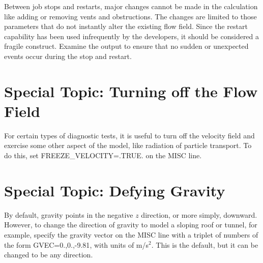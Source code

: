 \documentclass[11pt]{book}
\begin{document}
Between job stops and restarts, major changes cannot be made in the calculation like adding or removing vents and obstructions. The changes are limited to those parameters that do not instantly alter the existing flow field. Since the restart capability has been used infrequently by the developers, it should be considered a fragile construct. Examine the output to ensure that no sudden or unexpected events occur during the stop and restart.





\section{Special Topic: Turning off the Flow Field}
\label{info:freeze_velocity}

For certain types of diagnostic tests, it is useful to turn off the velocity field and exercise some other aspect of the model, like radiation of particle transport. To do this, set {\ct FREEZE\_VELOCITY=.TRUE.} on the {\ct MISC} line.


\section{Special Topic: Defying Gravity}
\label{info:GVEC}

By default, gravity points in the negative $z$ direction, or more simply, downward. However, to change the direction of gravity to model a sloping roof or tunnel, for example, specify the gravity vector on the {\ct MISC} line with a triplet of numbers of the form {\ct GVEC=0.,0.,-9.81}, with units of m/s$^2$. This is the default, but it can be changed to be any direction.
\end{document}
